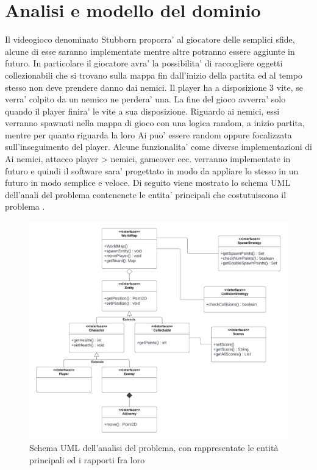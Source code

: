 \documentclass[a4paper,12pt]{report}
\begin{document}
\section{Analisi e modello del dominio}
Il videogioco denominato Stubborn proporra' al giocatore delle semplici sfide, alcune di esse saranno implementate mentre altre potranno essere aggiunte in futuro.
In particolare il giocatore avra' la possibilita' di raccogliere oggetti collezionabili che si trovano sulla mappa fin dall'inizio della partita ed al tempo stesso non deve prendere danno dai nemici.
Il player ha a disposizione 3 vite, se verra' colpito da un nemico ne perdera' una.
La fine del gioco avverra' solo quando il player finira' le vite a sua disposizione.
Riguardo ai nemici, essi verranno spawnati nella mappa di gioco con una logica random, a inizio partita, mentre per quanto riguarda la loro Ai puo' essere random oppure focalizzata sull'inseguimento del player.
Alcune funzionalita' come diverse implementazioni di Ai nemici, attacco player > nemici, gameover ecc. verranno implementate in futuro e quindi il software sara' progettato in modo da appliare lo stesso in un futuro in modo semplice e veloce.
Di seguito viene mostrato lo schema UML dell'anali del problema contenenete le entita' principali che costutuiscono il problema .

\begin{figure}[H]
\centering{}
\includegraphics[width=\textwidth,height=\textheight,keepaspectratio]{img/analysisUML.pdf}
\caption{Schema UML dell'analisi del problema, con rappresentate le entità principali ed i rapporti fra loro}
\label{img:analysisUML}
\end{figure}
\end{document}
